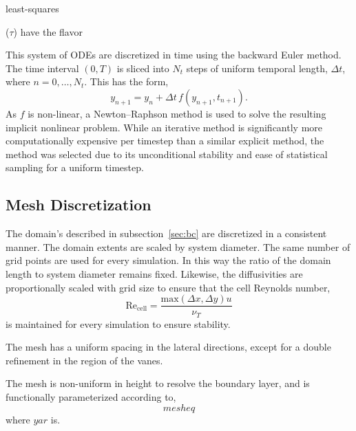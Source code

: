 least-squares 

 ($\tau$) have the flavor

This system of ODEs are discretized in time using the 
backward Euler method\cite{moin2010fundamentals}. The time interval
$(0,T)$ is sliced into $N_t$ steps of 
uniform temporal length,  $\Delta t$, where $n = 0,\dots,N_t$. 
This has the form, 
\begin{equation}
 y_{n+1} = y_n + \Delta t \, f(y_{n+1},t_{n+1}).
\end{equation}
As $f$ is non-linear, a Newton–Raphson method is used to solve the
resulting implicit nonlinear problem. While an iterative method is
significantly more computationally expensive per timestep than a similar
explicit method, the method was selected due to its unconditional
stability and ease of statistical sampling for a uniform timestep. 

%
%


\subsection{Mesh Discretization}
%
%
The domain's described in subsection~\ref{sec:bc} are
discretized in a consistent manner. The domain extents are scaled by
system diameter. The same number of grid points are used for every
simulation. In this way the ratio of the domain length to system
diameter remains fixed. Likewise, the diffusivities are proportionally
scaled with grid size to ensure that the cell Reynolds number, 
\begin{equation}
 \text{Re}_\text{cell} = \frac{\text{max}(\Delta x,\Delta y) u}{\nu_T}
\end{equation}
 is maintained for every simulation to ensure stability.

The mesh has a uniform spacing in the lateral directions, except for a
double refinement in the region of the vanes. 

The mesh is non-uniform in height to resolve the boundary layer, and is
functionally parameterized according to,
\begin{equation}
mesh eq  
\end{equation}
where $yar$ is.

